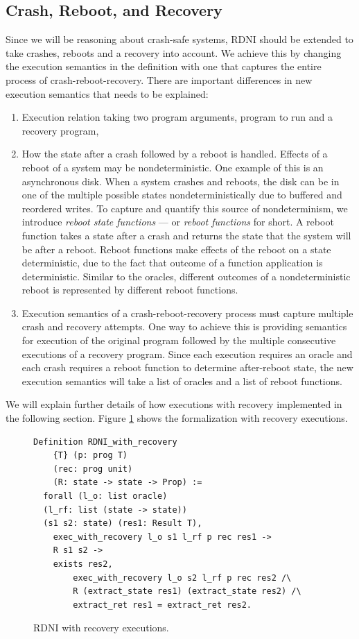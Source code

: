 \subsection{Crash, Reboot, and Recovery}
Since we will be reasoning about crash-safe systems, RDNI should be extended to take crashes, reboots and a recovery into account. We achieve this by changing the execution semantics in the definition with one that captures the entire process of crash-reboot-recovery. There are  important differences in new execution semantics that needs to be explained:
\begin{enumerate}
    \item Execution relation taking two program arguments, program to run and a recovery program,
    \item How the state after a crash followed by a reboot is handled.
 Effects of a reboot of a system may be nondeterministic. One example of this is an asynchronous disk. When a system crashes and reboots, the disk can be in one of the multiple possible states nondeterministically due to buffered and reordered writes. To capture and quantify this source of nondeterminism, we introduce  \emph{reboot state functions} --- or \emph{reboot functions} for short. A reboot function takes a state after a crash and returns the state that the system will be after a reboot. Reboot functions make effects of the reboot on a state deterministic, due to the fact that outcome of a function application is deterministic. Similar to the oracles, different outcomes of a nondeterministic reboot is represented by different reboot functions.
 
 \item Execution semantics of a crash-reboot-recovery process must capture multiple crash and recovery attempts. One way to achieve this is providing semantics for execution of the original program followed by the multiple consecutive executions of a recovery program. Since each execution requires an oracle and each crash requires a reboot function to determine after-reboot state, the new execution semantics will take a list of oracles and a list of reboot functions.
 \end{enumerate}

 We will explain further details of how executions with recovery implemented in the following section. Figure \ref{fig:RDNI_recovery} shows the formalization with recovery executions.

\begin{figure}[H]
    \centering
    \begin{verbatim}
Definition RDNI_with_recovery
    {T} (p: prog T) 
    (rec: prog unit)
    (R: state -> state -> Prop) :=
  forall (l_o: list oracle) 
  (l_rf: list (state -> state))
  (s1 s2: state) (res1: Result T),
    exec_with_recovery l_o s1 l_rf p rec res1 ->
    R s1 s2 ->
    exists res2,
        exec_with_recovery l_o s2 l_rf p rec res2 /\
        R (extract_state res1) (extract_state res2) /\
        extract_ret res1 = extract_ret res2.
    \end{verbatim}
    \caption{RDNI with recovery executions.}
    \label{fig:RDNI_recovery}
\end{figure}

